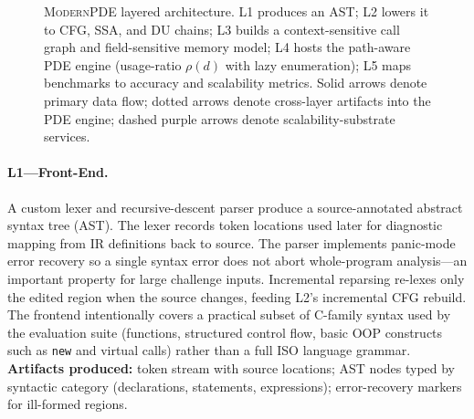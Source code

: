 \documentclass[acmsmall,screen,review,anonymous]{acmart}
\begin{document}
\begin{figure}[t]
{%
}
\caption{\textsc{ModernPDE} layered architecture. L1 produces an AST; L2 lowers it to CFG, SSA, and DU chains; L3 builds a context-sensitive call graph and field-sensitive memory model; L4 hosts the path-aware PDE engine (usage-ratio $\rho(d)$ with lazy enumeration); L5 maps benchmarks to accuracy and scalability metrics. Solid arrows denote primary data flow; dotted arrows denote cross-layer artifacts into the PDE engine; dashed purple arrows denote scalability-substrate services.}
\label{fig:pipeline}
\end{figure}
\FloatBarrier

\paragraph{L1---Front-End.}
A custom lexer and recursive-descent parser produce a source-annotated abstract syntax tree (AST). The lexer records token locations used later for diagnostic mapping from IR definitions back to source. The parser implements panic-mode error recovery so a single syntax error does not abort whole-program analysis---an important property for large challenge inputs. Incremental reparsing re-lexes only the edited region when the source changes, feeding L2's incremental CFG rebuild. The frontend intentionally covers a practical subset of C-family syntax used by the evaluation suite (functions, structured control flow, basic OOP constructs such as \texttt{new} and virtual calls) rather than a full ISO language grammar.
\textbf{Artifacts produced:} token stream with source locations; AST nodes typed by syntactic category (declarations, statements, expressions); error-recovery markers for ill-formed regions.
\end{document}
